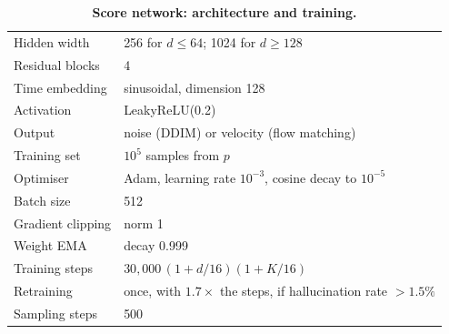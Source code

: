 \documentclass[11pt]{article}
\begin{document}
\begin{table}[htbp]
\centering
\small
\caption{\textbf{Score network: architecture and training.}}
\label{tab:scorenet}
\begin{tabular}{ll}
\toprule
Hidden width                  & 256 for $d \le 64$; 1024 for $d \ge 128$ \\
Residual blocks               & 4 \\
Time embedding                & sinusoidal, dimension 128 \\
Activation                    & LeakyReLU(0.2) \\
Output                        & noise (DDIM) or velocity (flow matching) \\
\midrule
Training set                  & $10^5$ samples from $p$ \\
Optimiser                     & Adam, learning rate $10^{-3}$, cosine decay to $10^{-5}$ \\
Batch size                    & 512 \\
Gradient clipping             & norm 1 \\
Weight EMA                    & decay 0.999 \\
Training steps                & $30{,}000\,(1 + d/16)(1 + K/16)$ \\
Retraining                    & once, with $1.7\times$ the steps, if hallucination rate $> 1.5\%$ \\
Sampling steps                & 500 \\
\bottomrule
\end{tabular}
\end{table}
\end{document}
